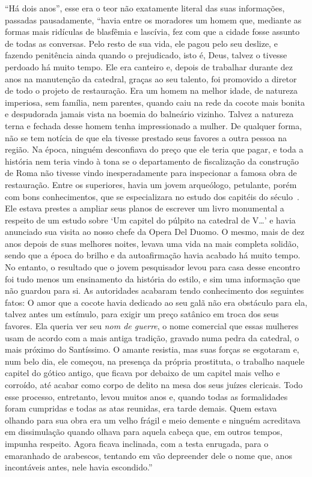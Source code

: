 ``Há dois anos'', esse era o teor não exatamente literal das suas
informações, passadas pausadamente, ``havia entre os moradores um homem
que, mediante as formas mais ridículas de blasfêmia e lascívia, fez com
que a cidade fosse assunto de todas as conversas. Pelo resto de sua
vida, ele pagou pelo seu deslize, e fazendo penitência ainda quando o
prejudicado, isto é, Deus, talvez o tivesse perdoado há muito tempo. Ele
era canteiro e, depois de trabalhar durante dez anos na manutenção da
catedral, graças ao seu talento, foi promovido a diretor de todo o
projeto de restauração. Era um homem na melhor idade, de natureza
imperiosa, sem família, nem parentes, quando caiu na rede da cocote mais
bonita e despudorada jamais vista na boemia do balneário vizinho. Talvez
a natureza terna e fechada desse homem tenha impressionado a mulher. De
qualquer forma, não se tem notícia de que ela tivesse prestado seus
favores a outra pessoa na região. Na época, ninguém desconfiava do preço
que ele teria que pagar, e toda a história nem teria vindo à tona se o
departamento de fiscalização da construção de Roma não tivesse vindo
inesperadamente para inspecionar a famosa obra de restauração. Entre os
superiores, havia um jovem arqueólogo, petulante, porém com bons
conhecimentos, que se especializara no estudo dos capitéis do
século~. Ele estava prestes a ampliar seus planos de escrever um
livro monumental a respeito de um estudo sobre `Um capitel do púlpito na
catedral de V\ldots{}' e havia anunciado sua visita ao nosso chefe da
Opera Del Duomo. O mesmo, mais de dez anos depois de suas
melhores noites, levava uma vida na mais completa solidão, sendo que a
época do brilho e da autoafirmação havia acabado há muito tempo. No
entanto, o resultado que o jovem pesquisador levou para casa desse
encontro foi tudo menos um ensinamento da história do estilo, e sim uma
informação que não guardou para si. As autoridades acabaram tendo
conhecimento dos seguintes fatos: O amor que a cocote havia dedicado ao
seu galã não era obstáculo para ela, talvez antes um estímulo, para
exigir um preço satânico em troca dos seus favores. Ela queria ver seu
\emph{nom de guerre}, o nome comercial que essas mulheres usam de acordo
com a mais antiga tradição, gravado numa pedra da catedral, o mais
próximo do Santíssimo. O amante resistia, mas suas forças se esgotaram
e, num belo dia, ele começou, na presença da própria prostituta, o
trabalho naquele capitel do gótico antigo, que ficava por debaixo de um
capitel mais velho e corroído, até acabar como corpo de delito na mesa
dos seus juízes clericais. Todo esse processo, entretanto, levou muitos
anos e, quando todas as formalidades foram cumpridas e todas as atas
reunidas, era tarde demais. Quem estava olhando para sua obra era um
velho frágil e meio demente e ninguém acreditava em dissimulação quando
olhava para aquela cabeça que, em outros tempos, impunha respeito. Agora
ficava inclinada, com a testa enrugada, para o emaranhado de arabescos,
tentando em vão depreender dele o nome que, anos incontáveis antes, nele
havia escondido.''

